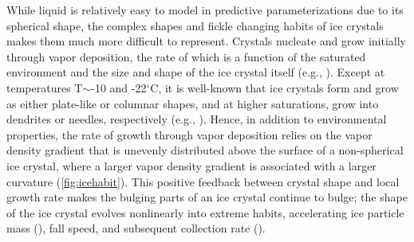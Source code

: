 While liquid is relatively easy to model in predictive parameterizations due to its spherical shape, the complex shapes and fickle changing habits of ice crystals makes them much more difficult to represent. Crystals nucleate and grow initially through vapor deposition, the rate of which is a function of the saturated environment and the size and shape of the ice crystal itself (e.g., \cite{hallett1958influence,chen1994theoretical}). Except at temperatures T$\sim$-10 and -22$^\circ$C, it is well-known that ice crystals form and grow as either plate-like or columnar shapes, and at higher saturations, grow into dendrites or needles, respectively (e.g., \cite{hallett1958influence}). Hence, in addition to environmental properties, the rate of growth through vapor deposition relies on the vapor density gradient that is unevenly distributed above the surface of a non-spherical ice crystal, where a larger vapor density gradient is associated with a larger curvature (\ref{fig:icehabit}). This positive feedback between crystal shape and local growth rate makes the bulging parts of an ice crystal continue to bulge; the shape of the ice crystal evolves nonlinearly into extreme habits, accelerating ice particle mass (\cite{lamb1971growth, sulia2017simulateda, chen1994theoretical, sulia2011ice}), fall speed, and subsequent collection rate (\cite{sulia2021new}). 

